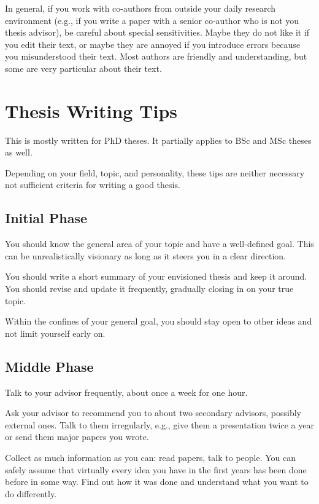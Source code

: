 \documentclass[12pt]{article}
\begin{document}
In general, if you work with co-authors from outside your daily research environment (e.g., if you write a paper with a senior co-author who is not you thesis advisor), be careful about special sensitivities.
Maybe they do not like it if you edit their text, or maybe they are annoyed if you introduce errors because you misunderstood their text.
Most authors are friendly and understanding, but some are very particular about their text.

\section{Thesis Writing Tips}

This is mostly written for PhD theses.
It partially applies to BSc and MSc theses as well.

Depending on your field, topic, and personality, these tips are neither necessary not sufficient criteria for writing a good thesis.

\subsection{Initial Phase}

You should know the general area of your topic and have a well-defined goal.
This can be unrealistically visionary as long as it steers you in a clear direction.
\medskip

You should write a short summary of your envisioned thesis and keep it around.
You should revise and update it frequently, gradually closing in on your true topic.
\medskip

Within the confines of your general goal, you should stay open to other ideas and not limit yourself early on.

\subsection{Middle Phase}

Talk to your advisor frequently, about once a week for one hour.
\medskip

Ask your advisor to recommend you to about two secondary advisors, possibly external ones.
Talk to them irregularly, e.g., give them a presentation twice a year or send them major papers you wrote.
\medskip

Collect as much information as you can: read papers, talk to people.
You can safely assume that virtually every idea you have in the first years has been done before in some way.
Find out how it was done and understand what you want to do differently.
\medskip
\end{document}
